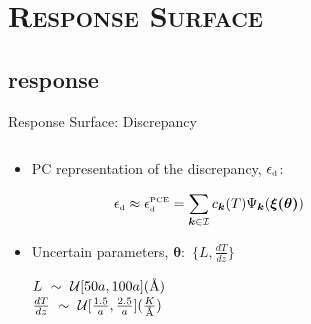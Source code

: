 \documentclass[xcolor={x11names,table},compress,svgnames,mathserif]{beamer}
\newcommand{\angstrom}{\textup{\AA}}
\renewcommand{\(}{\begin{columns}}
\renewcommand{\)}{\end{columns}}
\newcommand{\<}[1]{\begin{column}{#1}}
\renewcommand{\>}{\end{column}}
\newcommand*\myitem{%
  \item[\color{DeepSkyBlue4}\scalebox{0.6}{\ding{110}}]}
\newcommand{\be}{\begin{equation}}
\newcommand{\ee}{\end{equation}}
\begin{document}

\section{\scshape Response Surface}
\subsection{response}
\begin{frame}{Response Surface: Discrepancy}

\begin{columns}
\begin{column}{0.52\textwidth}

\begin{itemize}
\myitem PC representation of the discrepancy, 
$\epsilon_{\mbox{\tiny{d}}}$:
\vspace{-2mm}

\begin{center}
\begin{tcolorbox}[width=0.9\textwidth,colback=DeepSkyBlue!20,notitle,colframe=DeepSkyBlue!20,colupper=DeepSkyBlue4]
\vspace{-2mm}
\scriptsize
\be
\epsilon_{\mbox{\tiny{d}}} \approx \mathcal{\epsilon}_{\mbox{\tiny{d}}}^{\mbox{\tiny{PCE}}} = 
\sum_{\bm{k}\in\mathcal{I}} c_{\bm{k}}(T)\Psi_{\bm{k}}(\bm{\xi(\theta)})
 \nonumber
\ee
\end{tcolorbox}
\end{center}

\vspace{2mm}
\normalsize

\myitem Uncertain parameters, $\bm{\theta}$:~$\{L,\frac{dT}{dz}\}$
\scriptsize
\begin{center}
$L~\sim~\mathcal{U}[50a, 100a](\angstrom)$ \\ \vspace{2mm}
$\frac{dT}{dz}~\sim~\mathcal{U}[\frac{1.5}{a}, \frac{2.5}{a}](\frac{K}{\angstrom})$

\end{center}

\end{itemize}
\end{column}

\begin{column}{0.48\textwidth}


\end{column}
\end{columns}
\end{frame}
\end{document}

